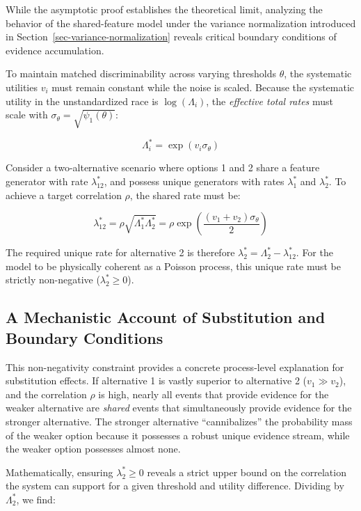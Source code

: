 \documentclass[
  man,
  floatsintext,
  longtable,
  a4paper,
  nolmodern,
  notxfonts,
  notimes,
  colorlinks=true,linkcolor=blue,citecolor=blue,urlcolor=blue]{apa7}
\begin{document}
While the asymptotic proof establishes the theoretical limit, analyzing
the behavior of the shared-feature model under the variance
normalization introduced in Section~\ref{sec-variance-normalization}
reveals critical boundary conditions of evidence accumulation.

To maintain matched discriminability across varying thresholds
\(\theta\), the systematic utilities \(v_i\) must remain constant while
the noise is scaled. Because the systematic utility in the
unstandardized race is \(\log(\Lambda_i)\), the \emph{effective total
rates} must scale with \(\sigma_\theta = \sqrt{\psi_1(\theta)}\):

\[\Lambda_i^* = \exp(v_i \sigma_\theta)\]

Consider a two-alternative scenario where options 1 and 2 share a
feature generator with rate \(\lambda_{12}^*\), and possess unique
generators with rates \(\lambda_1^*\) and \(\lambda_2^*\). To achieve a
target correlation \(\rho\), the shared rate must be:

\[\lambda_{12}^* = \rho \sqrt{\Lambda_1^* \Lambda_2^*} = \rho \exp\left(\frac{(v_1 + v_2) \sigma_\theta}{2}\right)\]

The required unique rate for alternative 2 is therefore
\(\lambda_2^* = \Lambda_2^* - \lambda_{12}^*\). For the model to be
physically coherent as a Poisson process, this unique rate must be
strictly non-negative (\(\lambda_2^* \ge 0\)).

\subsection{A Mechanistic Account of Substitution and Boundary
Conditions}\label{a-mechanistic-account-of-substitution-and-boundary-conditions}

This non-negativity constraint provides a concrete process-level
explanation for substitution effects. If alternative 1 is vastly
superior to alternative 2 (\(v_1 \gg v_2\)), and the correlation
\(\rho\) is high, nearly all events that provide evidence for the weaker
alternative are \emph{shared} events that simultaneously provide
evidence for the stronger alternative. The stronger alternative
``cannibalizes'' the probability mass of the weaker option because it
possesses a robust unique evidence stream, while the weaker option
possesses almost none.

Mathematically, ensuring \(\lambda_2^* \ge 0\) reveals a strict upper
bound on the correlation the system can support for a given threshold
and utility difference. Dividing by \(\Lambda_2^*\), we find:
\end{document}

